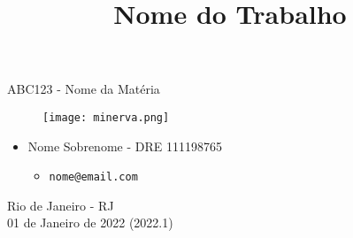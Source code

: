 \title{Nome do Trabalho}

\begin{titlepage}
    \begin{center}
        \LARGE
        ABC123 - Nome da Matéria
        

        \vspace{1.5cm}

        \Huge
        \thetitle

        \vspace{1.5cm}

        \Huge
        \begin{figure}[h]
            \centering
            \texttt{[image: minerva.png]}
        \end{figure}

        \vspace{2.5cm}

        \large
        \begin{itemize}
            \item Nome Sobrenome - DRE 111198765
            \begin{itemize}
                \item \texttt{nome@email.com}
            \end{itemize}
        \end{itemize}

        \vspace{1.5cm}


        \vfill
        
        \large
        Rio de Janeiro - RJ\\
        01 de Janeiro de 2022 (2022.1)

    \end{center}
\end{titlepage}